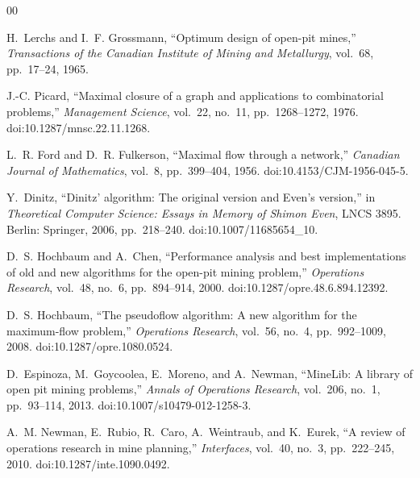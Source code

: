 \documentclass[journal]{IEEEtran}
\begin{document}
\begin{thebibliography}{00}

 H.~Lerchs and I.~F. Grossmann, ``Optimum design of open-pit mines,'' \emph{Transactions of the
Canadian Institute of Mining and Metallurgy}, vol.~68, pp.~17--24, 1965.

 J.-C. Picard, ``Maximal closure of a graph and applications to combinatorial problems,''
\emph{Management Science}, vol.~22, no.~11, pp.~1268--1272, 1976. doi:10.1287/mnsc.22.11.1268.

 L.~R. Ford and D.~R. Fulkerson, ``Maximal flow through a network,'' \emph{Canadian
Journal of Mathematics}, vol.~8, pp.~399--404, 1956. doi:10.4153/CJM-1956-045-5.

 Y.~Dinitz, ``Dinitz' algorithm: The original version and Even's version,'' in \emph{Theoretical
Computer Science: Essays in Memory of Shimon Even}, LNCS 3895. Berlin: Springer, 2006, pp.~218--240.
doi:10.1007/11685654\_10.

 D.~S. Hochbaum and A.~Chen, ``Performance analysis and best implementations of old and new
algorithms for the open-pit mining problem,'' \emph{Operations Research}, vol.~48, no.~6, pp.~894--914, 2000.
doi:10.1287/opre.48.6.894.12392.

 D.~S. Hochbaum, ``The pseudoflow algorithm: A new algorithm for the maximum-flow problem,''
\emph{Operations Research}, vol.~56, no.~4, pp.~992--1009, 2008. doi:10.1287/opre.1080.0524.

 D.~Espinoza, M.~Goycoolea, E.~Moreno, and A.~Newman, ``MineLib: A library of open pit mining
problems,'' \emph{Annals of Operations Research}, vol.~206, no.~1, pp.~93--114, 2013.
doi:10.1007/s10479-012-1258-3.

 A.~M. Newman, E.~Rubio, R.~Caro, A.~Weintraub, and K.~Eurek, ``A review of operations research
in mine planning,'' \emph{Interfaces}, vol.~40, no.~3, pp.~222--245, 2010. doi:10.1287/inte.1090.0492.

\end{thebibliography}
\end{document}

